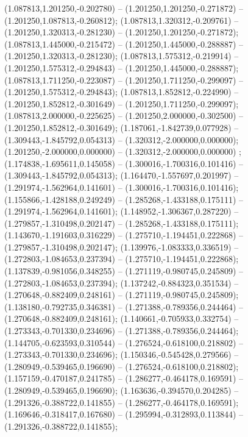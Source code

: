  (1.087813,1.201250,-0.202780) -- (1.201250,1.201250,-0.271872) -- (1.201250,1.087813,-0.260812);
 (1.087813,1.320312,-0.209761) -- (1.201250,1.320313,-0.281230) -- (1.201250,1.201250,-0.271872);
 (1.087813,1.445000,-0.215472) -- (1.201250,1.445000,-0.288887) -- (1.201250,1.320313,-0.281230);
 (1.087813,1.575312,-0.219914) -- (1.201250,1.575312,-0.294843) -- (1.201250,1.445000,-0.288887);
 (1.087813,1.711250,-0.223087) -- (1.201250,1.711250,-0.299097) -- (1.201250,1.575312,-0.294843);
 (1.087813,1.852812,-0.224990) -- (1.201250,1.852812,-0.301649) -- (1.201250,1.711250,-0.299097);
 (1.087813,2.000000,-0.225625) -- (1.201250,2.000000,-0.302500) -- (1.201250,1.852812,-0.301649);
 (1.187061,-1.842739,0.077928) -- (1.309443,-1.845792,0.054313) -- (1.320312,-2.000000,0.000000);
 (1.201250,-2.000000,0.000000) -- (1.320312,-2.000000,0.000000) ;
 (1.174838,-1.695611,0.145058) -- (1.300016,-1.700316,0.101416) -- (1.309443,-1.845792,0.054313);
 (1.164470,-1.557697,0.201997) -- (1.291974,-1.562964,0.141601) -- (1.300016,-1.700316,0.101416);
 (1.155866,-1.428188,0.249249) -- (1.285268,-1.433188,0.175111) -- (1.291974,-1.562964,0.141601);
 (1.148952,-1.306367,0.287220) -- (1.279857,-1.310498,0.202147) -- (1.285268,-1.433188,0.175111);
 (1.143670,-1.191603,0.316229) -- (1.275710,-1.194451,0.222868) -- (1.279857,-1.310498,0.202147);
 (1.139976,-1.083333,0.336519) -- (1.272803,-1.084653,0.237394) -- (1.275710,-1.194451,0.222868);
 (1.137839,-0.981056,0.348255) -- (1.271119,-0.980745,0.245809) -- (1.272803,-1.084653,0.237394);
 (1.137242,-0.884323,0.351534) -- (1.270648,-0.882409,0.248161) -- (1.271119,-0.980745,0.245809);
 (1.138180,-0.792735,0.346381) -- (1.271388,-0.789356,0.244464) -- (1.270648,-0.882409,0.248161);
 (1.140661,-0.705933,0.332754) -- (1.273343,-0.701330,0.234696) -- (1.271388,-0.789356,0.244464);
 (1.144705,-0.623593,0.310544) -- (1.276524,-0.618100,0.218802) -- (1.273343,-0.701330,0.234696);
 (1.150346,-0.545428,0.279566) -- (1.280949,-0.539465,0.196690) -- (1.276524,-0.618100,0.218802);
 (1.157159,-0.470187,0.241785) -- (1.286277,-0.464178,0.169591) -- (1.280949,-0.539465,0.196690);
 (1.163636,-0.394570,0.204285) -- (1.291326,-0.388722,0.141855) -- (1.286277,-0.464178,0.169591);
 (1.169646,-0.318417,0.167680) -- (1.295994,-0.312893,0.113844) -- (1.291326,-0.388722,0.141855);
